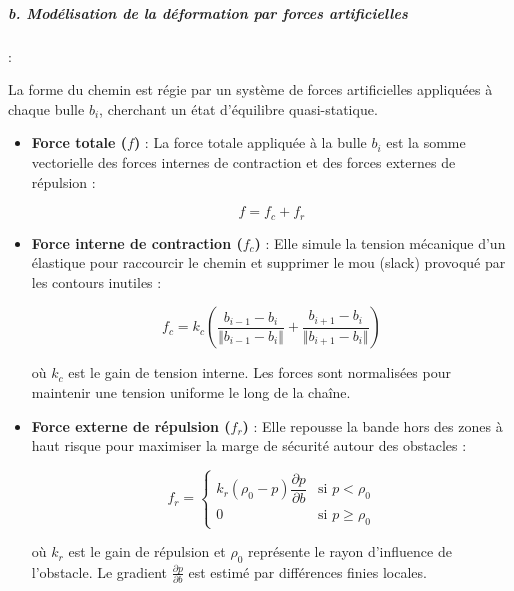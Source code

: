 \subparagraph{b. Modélisation de la déformation par forces artificielles}:

La forme du chemin est régie par un système de forces artificielles appliquées à chaque bulle $b_i$, cherchant un état d'équilibre quasi-statique. \\

\begin{itemize}

    \item \textbf{Force totale ($f$)} : La force totale appliquée à la bulle $b_i$ est la somme vectorielle des forces internes de contraction et des forces externes de répulsion :
    
    \begin{equation}
        f = f_c + f_r
        \label{eq11}
    \end{equation}

    \item \textbf{Force interne de contraction ($f_c$)} : Elle simule la tension mécanique d'un élastique pour raccourcir le chemin et supprimer le mou (slack) provoqué par les contours inutiles :
    
    \begin{equation}
        f_c = k_c \left( \frac{b_{i-1} - b_i}{\Vert{}b_{i-1} - b_i\Vert{}} + \frac{b_{i+1} - b_i}{\Vert{}b_{i+1} - b_i\Vert{}} \right)
        \label{eq12}
    \end{equation}

    où $k_c$ est le gain de tension interne. Les forces sont normalisées pour maintenir une tension uniforme le long de la chaîne. \\

    \item \textbf{Force externe de répulsion ($f_r$)} : Elle repousse la bande hors des zones à haut risque pour maximiser la marge de sécurité autour des obstacles :
    
    \begin{equation}
        f_r = \begin{cases}  k_r (\rho_0 - p) \dfrac{\partial p}{\partial b} & \text{si } p < \rho_0 \\  0 & \text{si } p \ge \rho_0  \end{cases}
        \label{eq13}
    \end{equation}    
    
    où $k_r$ est le gain de répulsion et $\rho_0$ représente le rayon d'influence de l'obstacle. Le gradient $\frac{\partial p}{\partial b}$ est estimé par différences finies locales. \\


\end{itemize}
